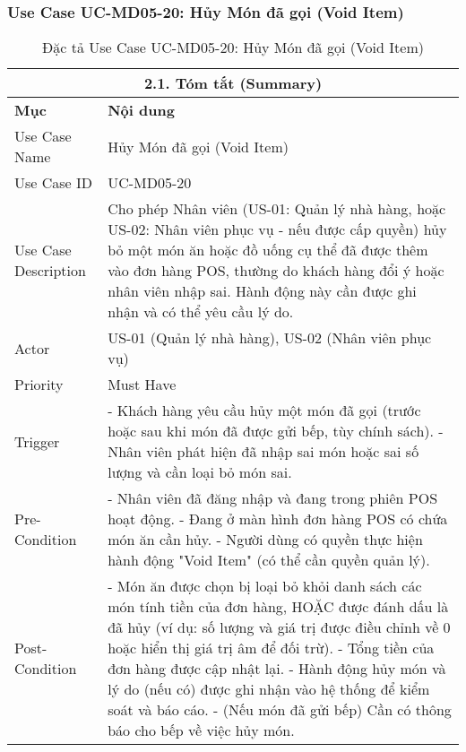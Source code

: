 \subsubsection{Use Case UC-MD05-20: Hủy Món đã gọi (Void Item)}
\begin{longtable}{|m{4cm}|p{11cm}|}
\caption{Đặc tả Use Case UC-MD05-20: Hủy Món đã gọi (Void Item)} \label{tab:uc_md05_20_final} \\
\hline
\multicolumn{2}{|c|}{\textbf{2.1. Tóm tắt (Summary)}} \\
\hline
\textbf{Mục} & \textbf{Nội dung} \\
\hline
\endhead %
\hline
\endfoot %
\hline
\endlastfoot %
Use Case Name & Hủy Món đã gọi (Void Item) \\
\hline
Use Case ID & UC-MD05-20 \\
\hline
Use Case Description & Cho phép Nhân viên (US-01: Quản lý nhà hàng, hoặc US-02: Nhân viên phục vụ - nếu được cấp quyền) hủy bỏ một món ăn hoặc đồ uống cụ thể đã được thêm vào đơn hàng POS, thường do khách hàng đổi ý hoặc nhân viên nhập sai. Hành động này cần được ghi nhận và có thể yêu cầu lý do. \\
\hline
Actor & US-01 (Quản lý nhà hàng), US-02 (Nhân viên phục vụ) \\
\hline
Priority & Must Have \\
\hline
Trigger & - Khách hàng yêu cầu hủy một món đã gọi (trước hoặc sau khi món đã được gửi bếp, tùy chính sách). \newline - Nhân viên phát hiện đã nhập sai món hoặc sai số lượng và cần loại bỏ món sai. \\
\hline
Pre-Condition & - Nhân viên đã đăng nhập và đang trong phiên POS hoạt động. \newline - Đang ở màn hình đơn hàng POS có chứa món ăn cần hủy. \newline - Người dùng có quyền thực hiện hành động "Void Item" (có thể cần quyền quản lý). \\
\hline
Post-Condition & - Món ăn được chọn bị loại bỏ khỏi danh sách các món tính tiền của đơn hàng, HOẶC được đánh dấu là đã hủy (ví dụ: số lượng và giá trị được điều chỉnh về 0 hoặc hiển thị giá trị âm để đối trừ). \newline - Tổng tiền của đơn hàng được cập nhật lại. \newline - Hành động hủy món và lý do (nếu có) được ghi nhận vào hệ thống để kiểm soát và báo cáo. \newline - (Nếu món đã gửi bếp) Cần có thông báo cho bếp về việc hủy món. \\

\end{longtable}
